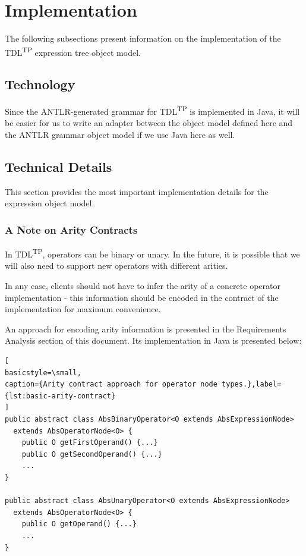 \documentclass[12pt,oneside,a4paper,notitlepage]{report}
\begin{document}
	\section*{Implementation}
	\par The following subsections present information on the implementation of the TDL\textsuperscript{TP} expression tree object model.

	\subsection*{Technology}
	\par Since the ANTLR-generated grammar for TDL\textsuperscript{TP} is implemented in Java, it will be easier for us to write an adapter between the object model defined here and the ANTLR grammar object model if we use Java here as well.

	\subsection*{Technical Details}
	\par This section provides the most important implementation details for the expression object model.

	\subsubsection*{A Note on Arity Contracts}
	\par In TDL\textsuperscript{TP}, operators can be binary or unary. In the future, it is possible that we will also need to support new operators with different arities.

	\bigskip

	\par In any case, clients should not have to infer the arity of a concrete operator implementation - this information should be encoded in the contract of the implementation for maximum convenience.

	\newpage

	\par An approach for encoding arity information is presented in the Requirements Analysis section of this document. Its implementation in Java is presented below:

	\begin{lstlisting}[
basicstyle=\small,
caption={Arity contract approach for operator node types.},label={lst:basic-arity-contract}
]
public abstract class AbsBinaryOperator<O extends AbsExpressionNode>
  extends AbsOperatorNode<O> {
	public O getFirstOperand() {...}
	public O getSecondOperand() {...}
	...
}

public abstract class AbsUnaryOperator<O extends AbsExpressionNode>
  extends AbsOperatorNode<O> {
	public O getOperand() {...}
	...
}
	\end{lstlisting}
\end{document}
